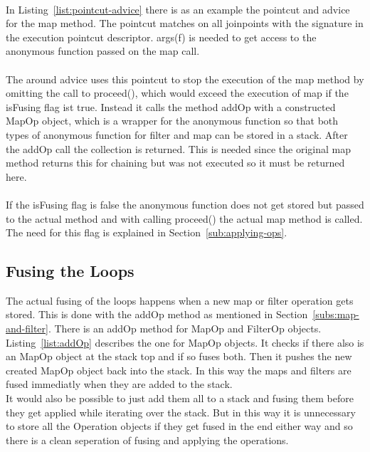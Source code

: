 \documentclass[runningheads,a4paper]{llncs}
\begin{document}
\lstset{caption=The pointcut matching all executions of the map method and the advice which adds the fusing behavior to., language=AspectJ, label=list:pointcut-advice}

\\
In Listing~\ref{list:pointcut-advice} there is as an example the pointcut and advice for the map method. The pointcut matches on all joinpoints with the signature in the execution pointcut descriptor.
args(f) is needed to get access to the anonymous function passed on the map call.\\
\\
The around advice uses this pointcut to stop the execution of the map method by omitting the call to proceed(), which would exceed the execution of map if the isFusing flag ist true.
Instead it calls the method addOp with a constructed MapOp object, which is a wrapper for the anonymous function so that both types of anonymous function for filter and map can be stored in a stack.
After the addOp call the collection is returned. This is needed since the original map method returns this for chaining but was not executed so it must be returned here.\\
\\
If the isFusing flag is false the anonymous function does not get stored but passed to the actual method and with calling proceed() the actual map method is called. The need for this flag is explained in Section~\ref{sub:applying-ops}.

\lstset{caption=The addOp method which fuses two map operations if the at the top of the stack is also a MapOp object. The addOp method for filters works analogously., language=Java, label=list:addOp}


\subsection{Fusing the Loops}\label{subs:loop-fusing}
The actual fusing of the loops happens when a new map or filter operation gets stored. This is done with the addOp method as mentioned in Section~\ref{subs:map-and-filter}.
There is an addOp method for MapOp and FilterOp objects. Listing~\ref{list:addOp} describes the one for MapOp objects.
It checks if there also is an MapOp object at the stack top and if so fuses both. Then it pushes the new created MapOp object back into the stack.
In this way the maps and filters are fused immediatly when they are added to the stack.\\
It would also be possible to just add them all to a stack and fusing them before they get applied while iterating over the stack.
But in this way it is unnecessary to store all the Operation objects if they get fused in the end either way and so there is a clean seperation of fusing and applying the operations.
\end{document}

